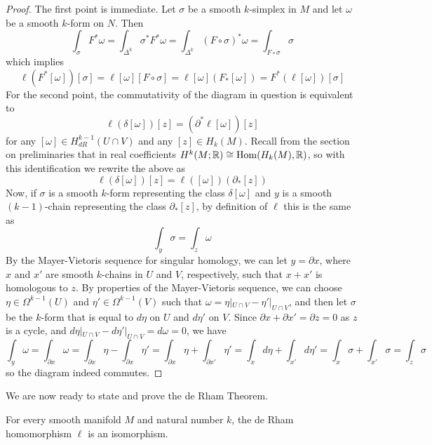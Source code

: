 \documentclass[a4paper, 12pt]{article}
\begin{document}
\begin{proof}
    The first point is immediate.
    Let $\sigma$ be a smooth $k$-simplex in $M$ and let $\omega$ be a smooth $k$-form on $N$.
    Then
    \[
        \int_{\sigma} F^*\omega
        = \int_{\Delta^k} \sigma^*F^*\omega
        = \int_{\Delta^k} (F \circ \sigma)^* \omega
        = \int_{F\circ\sigma} \sigma
    \]
    which implies
    \[
        \ell(F^*[\omega])[\sigma]
        = \ell[\omega][F\circ\sigma]
        = \ell[\omega](F_*[\omega])
        = F^*(\ell[\omega])[\sigma]
    \]
    For the second point, the commutativity of the diagram in question is equivalent to
    \[
        \ell(\delta[\omega])[z] = (\partial^*\ell[\omega])[z]
    \]
    for any $[\omega] \in H_{dR}^{k-1}(U\cap V)$ and any $[z] \in H_k(M)$.
    Recall from the section on preliminaries that in real coefficients $H^k(M; \mathbb{R}) \cong \operatorname{Hom}(H_k(M), \mathbb{R})$,
    so with this identification we rewrite the above as
    \[
        \ell(\delta[\omega])[z] = \ell([\omega])(\partial_*[z])
    \]
    Now, if $\sigma$ is a smooth $k$-form representing the class $\delta[\omega]$
    and $y$ is a smooth $(k-1)$-chain representing the class $\partial_*[z]$,
    by definition of $\ell$ this is the same as
    \[
        \int_{y} \sigma = \int_{z} \omega
    \]
    By the Mayer-Vietoris sequence for singular homology,
    we can let $y = \partial x$, where $x$ and $x'$ are smooth $k$-chains in $U$ and $V$,
    respectively, such that $x + x'$ is homologous to $z$.
    By properties of the Mayer-Vietoris sequence, we can choose $\eta \in \Omega^{k-1}(U)$ and $\eta' \in \Omega^{k-1}(V)$
    such that $\omega = \eta|_{U \cap V} - \eta'|_{U\cap V}$,
    and then let $\sigma$ be the $k$-form that is equal to $d\eta$ on $U$ and $d\eta'$ on $V$.
    Since $\partial x + \partial x' = \partial z = 0$ as $z$ is a cycle,
    and $d\eta|_{U\cap V} - d\eta'|_{U\cap V} = d\omega = 0$,
    we have
    \[
        \int_{y} \omega
        = \int_{\partial x} \omega
        = \int_{\partial x} \eta - \int_{\partial x} \eta'
        = \int_{\partial x} \eta + \int_{\partial x'} \eta'
        = \int_{x} d\eta + \int_{x'} d\eta'
        = \int_{x} \sigma + \int_{x'} \sigma
        = \int_{z} \sigma
    \]
    so the diagram indeed commutes.
\end{proof}
We are now ready to state and prove the de Rham Theorem.
\begin{theorem}
    For every smooth manifold $M$ and natural number $k$, the de Rham homomorphism $\ell$ is an isomorphism.
\end{theorem}
\end{document}
